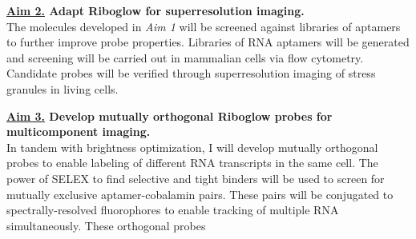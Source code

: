 {\bf \underline{Aim 2.} Adapt Riboglow for superresolution imaging.}\\
The molecules developed in \textit{Aim 1} will be screened against libraries of aptamers to further improve probe properties. Libraries of RNA aptamers will be generated and screening will be carried out in mammalian cells via flow cytometry. Candidate probes will be verified through superresolution imaging of stress granules in living cells.

{\bf \underline{Aim 3.} Develop mutually orthogonal Riboglow probes for multicomponent imaging.}\\
In tandem with brightness optimization, I will develop mutually orthogonal probes to enable labeling of different RNA transcripts in the same cell. The power of SELEX to find selective and tight binders will be used to screen for mutually exclusive aptamer-cobalamin pairs. These pairs will be conjugated to spectrally-resolved fluorophores to enable tracking of multiple RNA simultaneously. These orthogonal probes 

